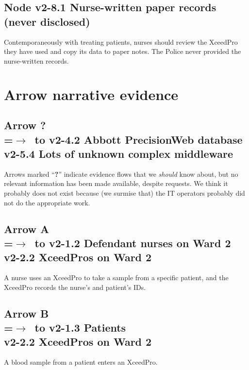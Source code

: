 \subsection*{  Node v2-8.1 Nurse-written paper records (never disclosed)}
	Contemporaneously with treating patients, nurses should review the XceedPro they have used and copy its data to paper notes. The Police never provided the nurse-written records. 

\section*{Arrow narrative evidence}
\subsection*{Arrow ?\\
=\hbox{$\rightarrow$~}\hbox to v2-4.2 Abbott PrecisionWeb database\\v2-5.4 Lots of unknown complex middleware}
Arrows marked ``\textbf{?}'' indicate evidence flows that we \emph{should\/} know about, but no relevant information has been made available, despite requests. We think it probably does not exist because (we surmise that) the IT operators probably did not do the appropriate work.
\subsection*{Arrow  A\\
=\hbox{$\rightarrow$~}\hbox to v2-1.2 Defendant nurses on Ward 2\\v2-2.2 XceedPros on Ward 2}
A nurse uses an XceedPro to take a sample from a specific patient, and the XceedPro records the nurse’s and patient's IDs.
\subsection*{Arrow  B\\
=\hbox{$\rightarrow$~}\hbox to v2-1.3 Patients\\v2-2.2 XceedPros on Ward 2}
A blood sample from a patient enters an XceedPro.
